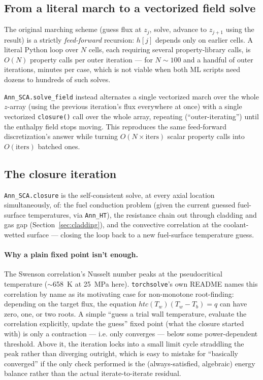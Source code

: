 \documentclass[11pt]{article}
\begin{document}
\subsection{From a literal march to a vectorized field solve}

The original marching scheme (guess flux at $z_j$, solve, advance to
$z_{j+1}$ using the result) is a strictly \emph{feed-forward} recursion:
$h[j]$ depends only on earlier cells. A literal Python loop over $N$ cells,
each requiring several property-library calls, is $O(N)$ property calls
per outer iteration --- for $N\sim100$ and a handful of outer iterations,
minutes per case, which is not viable when both ML scripts need dozens to
hundreds of such solves.

\texttt{Ann\_SCA.solve\_field} instead alternates a single vectorized march
over the whole $z$-array (using the previous iteration's flux everywhere
at once) with a single vectorized \texttt{closure()} call over the whole
array, repeating (``outer-iterating'') until the enthalpy field stops
moving. This reproduces the same feed-forward discretization's answer while
turning $O(N \times \text{iters})$ scalar property calls into
$O(\text{iters})$ batched ones.

\subsection{The closure iteration}
\label{sec:closure}

\texttt{Ann\_SCA.closure} is the self-consistent solve, at every axial
location simultaneously, of: the fuel conduction problem (given the
current guessed fuel-surface temperatures, via \texttt{Ann\_HT}), the
resistance chain out through cladding and gas gap
(Section~\ref{sec:cladding}), and the convective correlation at the
coolant-wetted surface --- closing the loop back to a new fuel-surface
temperature guess.

\paragraph{Why a plain fixed point isn't enough.} The Swenson correlation's
Nusselt number peaks at the pseudocritical temperature ($\sim$658~K at
25~MPa here). \texttt{torchsolve}'s own README names this correlation by
name as its motivating case for non-monotone root-finding: depending on
the target flux, the equation $htc(T_w)(T_w - T_b) = q$ can have zero, one,
or two roots. A simple ``guess a trial wall temperature, evaluate the
correlation explicitly, update the guess'' fixed point (what the closure
started with) is only a contraction --- i.e. only converges --- below some
power-dependent threshold. Above it, the iteration locks into a small
limit cycle straddling the peak rather than diverging outright, which is
easy to mistake for ``basically converged'' if the only check performed is
the (always-satisfied, algebraic) energy balance rather than the actual
iterate-to-iterate residual.
\end{document}
